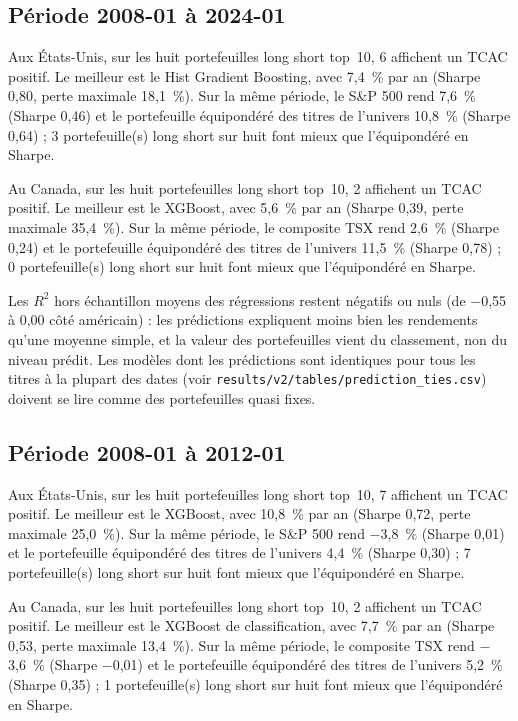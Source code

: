 
\subsection*{Période 2008-01 à 2024-01}

Aux États-Unis, sur les huit portefeuilles long short top~10, 6 affichent un TCAC positif. Le meilleur est le Hist Gradient Boosting, avec 7,4~\% par an (Sharpe 0,80, perte maximale 18,1~\%). Sur la même période, le S\&P 500 rend 7,6~\% (Sharpe 0,46) et le portefeuille équipondéré des titres de l'univers 10,8~\% (Sharpe 0,64) ; 3 portefeuille(s) long short sur huit font mieux que l'équipondéré en Sharpe.

Au Canada, sur les huit portefeuilles long short top~10, 2 affichent un TCAC positif. Le meilleur est le XGBoost, avec 5,6~\% par an (Sharpe 0,39, perte maximale 35,4~\%). Sur la même période, le composite TSX rend 2,6~\% (Sharpe 0,24) et le portefeuille équipondéré des titres de l'univers 11,5~\% (Sharpe 0,78) ; 0 portefeuille(s) long short sur huit font mieux que l'équipondéré en Sharpe.

Les $R^2$ hors échantillon moyens des régressions restent négatifs ou nuls (de $-$0,55 à 0,00 côté américain) : les prédictions expliquent moins bien les rendements qu'une moyenne simple, et la valeur des portefeuilles vient du classement, non du niveau prédit. Les modèles dont les prédictions sont identiques pour tous les titres à la plupart des dates (voir \texttt{results/v2/tables/prediction\_ties.csv}) doivent se lire comme des portefeuilles quasi fixes.

\subsection*{Période 2008-01 à 2012-01}

Aux États-Unis, sur les huit portefeuilles long short top~10, 7 affichent un TCAC positif. Le meilleur est le XGBoost, avec 10,8~\% par an (Sharpe 0,72, perte maximale 25,0~\%). Sur la même période, le S\&P 500 rend $-$3,8~\% (Sharpe 0,01) et le portefeuille équipondéré des titres de l'univers 4,4~\% (Sharpe 0,30) ; 7 portefeuille(s) long short sur huit font mieux que l'équipondéré en Sharpe.

Au Canada, sur les huit portefeuilles long short top~10, 2 affichent un TCAC positif. Le meilleur est le XGBoost de classification, avec 7,7~\% par an (Sharpe 0,53, perte maximale 13,4~\%). Sur la même période, le composite TSX rend $-$3,6~\% (Sharpe $-$0,01) et le portefeuille équipondéré des titres de l'univers 5,2~\% (Sharpe 0,35) ; 1 portefeuille(s) long short sur huit font mieux que l'équipondéré en Sharpe.

